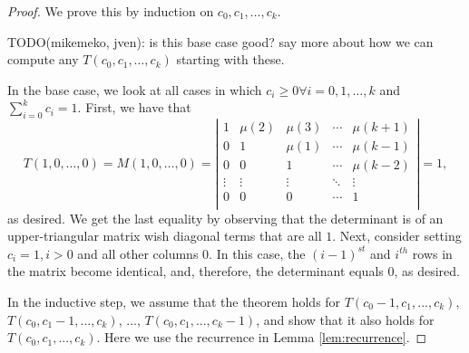 \documentclass[12pt]{amsart}
\newcommand{\ifact}{\mu}
\newcommand{\M}{M}
\begin{document}
\begin{proof}
We prove this by induction on $c_0, c_1, \dots, c_k$.

TODO(mikemeko, jven): is this base case good? say more about how we can compute any $T(c_0, c_1, \dots, c_k)$ starting with these.

In the base case, we look at all cases in which $c_i \geq 0 \forall i = 0,1,\dots,k$ and $\sum_{i=0}^{k}{c_i} = 1$. First, we have that
$$
T(1,0,\dots,0) = \M(1,0,\dots,0)=\left|
\begin{matrix}
1 & \ifact(2) & \ifact(3) & \cdots & \ifact(k+1) \\
0 & 1 & \ifact(1) & \cdots & \ifact(k-1) \\
0 & 0 & 1 & \cdots & \ifact(k-2) \\
\vdots & \vdots & \vdots & \ddots & \vdots \\
0 & 0 & 0 & \cdots & 1 \\
\end{matrix} \right| = 1,
$$
as desired. We get the last equality by observing that the determinant is of an upper-triangular matrix wish diagonal terms that are all $1$. Next, consider setting $c_i = 1, i > 0$ and all other columns $0$. In this case, the $(i-1)^{st}$ and $i^{th}$ rows in the matrix become identical, and, therefore, the determinant equals $0$, as desired.

In the inductive step, we assume that the theorem holds for $T(c_0-1,c_1,...,c_k)$, $T(c_0,c_1-1,...,c_k)$, $\dots$, $T(c_0,c_1,...,c_k-1)$, and show that it also holds for $T(c_0,c_1,...,c_k)$. Here we use the recurrence in Lemma \ref{lem:recurrence}.


\end{proof}
\end{document}
